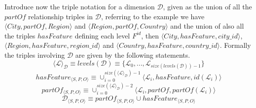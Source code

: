 \documentclass[12pt,a4paper]{report}
\newcommand\subject{S}
\newcommand\predicate{P}
\newcommand\object{O}
\newcommand\feature{F}
\newcommand\idFeature{\feature^{id}}
\newcommand\triple[1]{#1_{\set{\subject,\predicate,\object}}}
\newcommand\dimension{\mathcal{D}}
\newcommand\level{\mathcal{L}}
\newcommand\partOfFunLabel{partOf}
\newcommand\id{id}
\newcommand\levels{levels}
\newcommand\set[1]{\langle #1 \rangle}
\begin{document}
Introduce now the triple notation for a dimension $\dimension$, given as the union of all the $\partOfFunLabel$ relationship triples in $\dimension$, referring to the example we have $\set{City,\partOfFunLabel,Region}$ and $\set{Region,\partOfFunLabel,Country}$ and the union of also all the triples $hasFeature$ defining each level $\idFeature$, then $\set{City,hasFeature,city\_id}$, $ \set{Region,hasFeature,region\_id} $ and $\set{Country,hasFeature,country\_id}$.
%
Formally the triples involving $\dimension$ are given by the following statements.
%
\begin{equation}
    \set{\level}_{\dimension} \equiv \levels(\dimension) \equiv \{\level_{0},...,\level_{size(\levels(\dimension)) - 1}\}
\end{equation}
%
\begin{equation}
    \triple{hasFeature} \equiv \cup_{i = 0}^{size(\set{\level}_{\dimension}) - 1} \langle \level_{i}, hasFeature, \id(\level_{i}) \rangle
\end{equation}
%
\begin{equation}
    \triple{\partOfFunLabel} \equiv \cup_{i = 0}^{size(\set{\level}_{\dimension}) - 2} \langle \level_{i}, \partOfFunLabel, \partOfFunLabel(\level_{i}) \rangle
\end{equation}
%
\begin{equation}
    \triple{\dimension} \equiv \triple{\partOfFunLabel} \cup \triple{hasFeature}
\end{equation}
%
\end{document}
